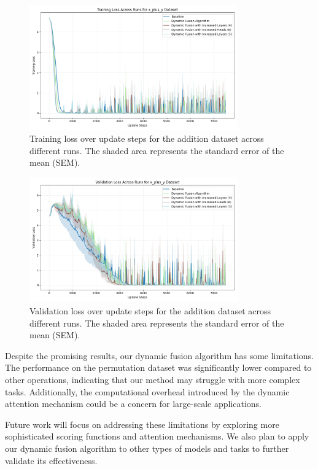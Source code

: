 \documentclass{article} %
\begin{document}
\begin{figure}[h]
    \centering
    \includegraphics[width=0.8\textwidth]{train_loss_x_plus_y.png}
    \caption{Training loss over update steps for the addition dataset across different runs. The shaded area represents the standard error of the mean (SEM).}
    \label{fig:train_loss_x_plus_y}
\end{figure}

\begin{figure}[h]
    \centering
    \includegraphics[width=0.8\textwidth]{val_loss_x_plus_y.png}
    \caption{Validation loss over update steps for the addition dataset across different runs. The shaded area represents the standard error of the mean (SEM).}
    \label{fig:val_loss_x_plus_y}
\end{figure}

Despite the promising results, our dynamic fusion algorithm has some limitations. The performance on the permutation dataset was significantly lower compared to other operations, indicating that our method may struggle with more complex tasks. Additionally, the computational overhead introduced by the dynamic attention mechanism could be a concern for large-scale applications.

Future work will focus on addressing these limitations by exploring more sophisticated scoring functions and attention mechanisms. We also plan to apply our dynamic fusion algorithm to other types of models and tasks to further validate its effectiveness.
\end{document}
